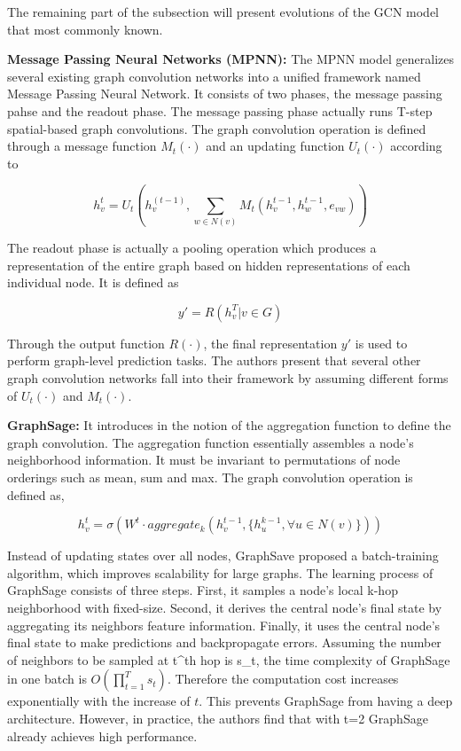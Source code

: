 The remaining part of the subsection will present evolutions of the GCN model that most commonly known.

\textbf{Message Passing Neural Networks (MPNN):} The MPNN model generalizes several existing graph convolution networks into a unified framework named Message Passing Neural Network. It consists of two phases, the message passing pahse and the readout phase. The message passing phase actually runs T-step spatial-based graph convolutions. The graph convolution operation is defined through a message function $M_t(\cdot)$ and an updating function $U_t(\cdot)$ according to 

$$ h_v^t = U_t(h_v^{(t-1)}, \sum_{w \in N(v)} M_t(h_v^{t-1}, h_w^{t-1}, e_{vw}))$$

The readout phase is actually a pooling operation which produces a representation of the entire graph based on hidden representations of each individual node. It is defined as 

$$ y' = R(h_v^T|v \in G) $$

Through the output function $R(\cdot)$, the final representation $y'$ is used to perform graph-level prediction tasks. The authors \cite{mpnn} present that several other graph convolution networks fall into their framework by assuming different forms of $U_t(\cdot)$ and $M_t(·)$.


\textbf{GraphSage:} It introduces in \cite{graphsage} the notion of the aggregation function to define the graph convolution. The aggregation function essentially assembles a node's neighborhood information. It must be invariant to permutations of node orderings such as mean, sum and max. The graph convolution operation is defined as, 

$$ h_v^t = \sigma(W^t \cdot aggregate_k(h_v^{t-1}, \{h_u^{k-1}, \forall u \in N(v)\}))$$

Instead of updating states over all nodes, GraphSave proposed a batch-training algorithm, which improves scalability for large graphs. The learning process of GraphSage consists of three steps. First, it samples a node's local k-hop neighborhood with fixed-size. Second, it derives the central node's final state by aggregating its neighbors feature information. Finally, it uses the central node's final state to make predictions and backpropagate errors. Assuming the number of neighbors to be sampled at t^{th} hop is s_t, the time complexity of GraphSage in one batch is $O(\prod_{t=1}^{T}s_t)$. Therefore the computation cost increases exponentially with the increase of $t$. This prevents GraphSage from having a deep architecture. However, in practice, the authors find that with t=2 GraphSage already achieves high performance.

